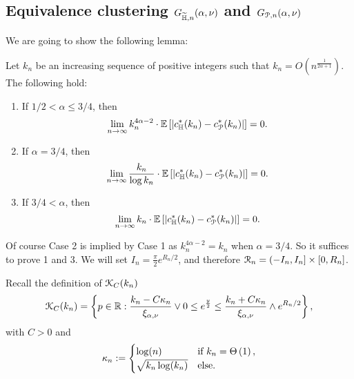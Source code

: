 \subsection{Equivalence clustering $G_{\widetilde{\mathbb{H}},n}(\alpha,\nu)$ and $G_{{\mathcal P},n}(\alpha,\nu)$}\label{ssec:coupling_HP_ast_P}

We are going to show the following lemma: 
\begin{lemma} \label{lem:edge_discrepancy}
Let $k_n$ be an increasing sequence of positive integers such that 
$k_n= O(n^{\frac{1}{2\alpha +1}})$. The following hold:
\begin{enumerate}
\item If $1/2 < \alpha \leq 3/4$, then
$$ \lim_{n\to \infty} k_n^{4\alpha -2}\cdot \mathbb{E}\left[\left|  c_{\mathbb{H}}^\ast(k_n) - c_{{\mathcal P}}^\ast(k_n)\right|\right]=0. $$
\item If $\alpha = 3/4$, then 
$$ \lim_{n\to \infty} \frac{k_n}{\log k_n} \cdot \mathbb{E}\left[\left|  c_{\mathbb{H}}^\ast(k_n) - c_{{\mathcal P}}^\ast(k_n)\right|\right]=0.$$
\item If $3/4 < \alpha$, then
$$ \lim_{n\to \infty} k_n \cdot \mathbb{E}\left[\left|  c_{\mathbb{H}}^\ast(k_n) - c_{{\mathcal P}}^\ast(k_n)\right|\right]=0. $$
\end{enumerate}
\end{lemma}
Of course Case 2 is implied by Case 1 as $k_n^{4\alpha -2} = k_n$ when $\alpha =3/4$. So it suffices to prove 1 and 3. 
We will set $I_n = \frac{\pi}{2} e^{R_n/2}$, and therefore 
${\mathcal R}_n= (-I_n, I_n] \times [0,R_n]$. 

Recall the definition of ${\mathcal K}_{C}(k_n)$
\[
	{\mathcal K}_C(k_n) = \left\{p \in {\ensuremath{\mathbb R}} : \frac{k_n - C \kappa_n}{\xi_{\alpha,\nu}} \vee 0 \le e^{\frac{y}{2}}
	\le \frac{k_n + C \kappa_n}{\xi_{\alpha,\nu}} \wedge e^{R_n/2} \right\},
\]
with $C > 0$ and 
\[
	\kappa_n := \begin{cases}
		\log(n) &\mbox{if } k_n = \Theta\left(1\right),\\
		\sqrt{k_n \log(k_n)} &\mbox{else.}
	\end{cases}
\]

